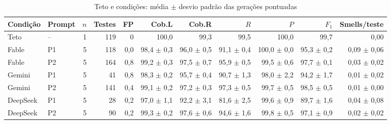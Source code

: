 \begin{table}[htb]
    \centering
    \ABNTEXfontereduzida
    \begin{minipage}{\textwidth}
        \caption{Teto e condições: média $\pm$ desvio padrão das gerações pontuadas}
        \label{tab:consolidada}
        \centering\scriptsize\setlength{\tabcolsep}{3pt}
        \begin{tabular}{llr rr rr rrr r}
            \toprule
            \textbf{Condição} & \textbf{Prompt} & $n$ & \textbf{Testes} & \textbf{FP} & \textbf{Cob.L} & \textbf{Cob.R} & $R$ & $P$ & $F_1$ & \textbf{Smells/teste} \\
            \midrule
            Teto & -- & 1 & 119 & 0 & 100,0 & 99,3 & 99,5 & 100,0 & 99,7 & 0,00 \\
            \midrule
            Fable & P1 & 5 & 118 & 0,0 & 98,4 $\pm$ 0,3 & 96,0 $\pm$ 0,5 & 91,1 $\pm$ 0,4 & 100,0 $\pm$ 0,0 & 95,3 $\pm$ 0,2 & 0,09 $\pm$ 0,06 \\
            Fable & P2 & 5 & 164 & 0,8 & 99,2 $\pm$ 0,3 & 97,5 $\pm$ 0,7 & 95,9 $\pm$ 0,5 & 99,5 $\pm$ 0,6 & 97,7 $\pm$ 0,1 & 0,03 $\pm$ 0,02 \\
            Gemini & P1 & 5 & 41 & 0,8 & 98,3 $\pm$ 0,2 & 95,7 $\pm$ 0,4 & 90,7 $\pm$ 1,3 & 98,0 $\pm$ 2,2 & 94,2 $\pm$ 1,7 & 0,01 $\pm$ 0,02 \\
            Gemini & P2 & 5 & 141 & 0,4 & 99,1 $\pm$ 0,2 & 97,2 $\pm$ 0,3 & 97,3 $\pm$ 0,5 & 99,7 $\pm$ 0,5 & 98,5 $\pm$ 0,5 & 0,01 $\pm$ 0,00 \\
            DeepSeek & P1 & 5 & 28 & 0,2 & 97,0 $\pm$ 1,1 & 92,2 $\pm$ 3,1 & 81,6 $\pm$ 2,5 & 99,6 $\pm$ 0,9 & 89,7 $\pm$ 1,6 & 0,04 $\pm$ 0,08 \\
            DeepSeek & P2 & 5 & 90 & 0,2 & 99,3 $\pm$ 0,2 & 97,6 $\pm$ 0,6 & 94,6 $\pm$ 1,6 & 99,8 $\pm$ 0,5 & 97,1 $\pm$ 0,9 & 0,02 $\pm$ 0,02 \\
            \bottomrule
        \end{tabular}
    \end{minipage}
\end{table}
